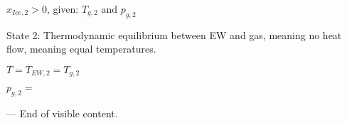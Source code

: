\( x_{Ice,2} > 0 \), given: \( T_{g,2} \) and \( p_{g,2} \)  

State 2: Thermodynamic equilibrium between EW and gas, meaning no heat flow, meaning equal temperatures.  

\( T = T_{EW,2} = T_{g,2} \)  

\( p_{g,2} = \)  

---  
End of visible content.